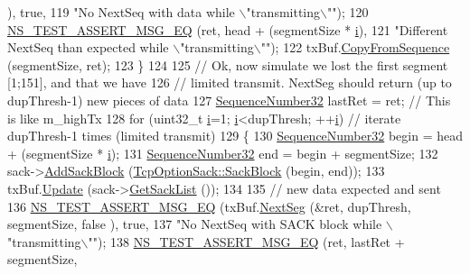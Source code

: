 \begin{DoxyCode}
      ), \textcolor{keyword}{true},
119                              \textcolor{stringliteral}{"No NextSeq with data while \(\backslash\)"transmitting\(\backslash\)""});
120       \hyperlink{group__testing_ga2a9d78cffb3db8e867c35fff0b698cf5}{NS\_TEST\_ASSERT\_MSG\_EQ} (ret, head + (segmentSize * \hyperlink{bernuolliDistribution_8m_a6f6ccfcf58b31cb6412107d9d5281426}{i}),
121                              \textcolor{stringliteral}{"Different NextSeq than expected while \(\backslash\)"transmitting\(\backslash\)""});
122       txBuf.\hyperlink{classns3_1_1TcpTxBuffer_a5eb9c889cfad2cd11a5ccf996c506fd3}{CopyFromSequence} (segmentSize, ret);
123     \}
124 
125   \textcolor{comment}{// Ok, now simulate we lost the first segment [1;151], and that we have}
126   \textcolor{comment}{// limited transmit. NextSeg should return (up to dupThresh-1) new pieces of data}
127   \hyperlink{classns3_1_1SequenceNumber}{SequenceNumber32} lastRet = ret; \textcolor{comment}{// This is like m\_highTx}
128   \textcolor{keywordflow}{for} (uint32\_t \hyperlink{bernuolliDistribution_8m_a6f6ccfcf58b31cb6412107d9d5281426}{i}=1; \hyperlink{bernuolliDistribution_8m_a6f6ccfcf58b31cb6412107d9d5281426}{i}<dupThresh; ++\hyperlink{bernuolliDistribution_8m_a6f6ccfcf58b31cb6412107d9d5281426}{i}) \textcolor{comment}{// iterate dupThresh-1 times (limited transmit)}
129     \{
130       \hyperlink{classns3_1_1SequenceNumber}{SequenceNumber32} begin = head + (segmentSize * \hyperlink{bernuolliDistribution_8m_a6f6ccfcf58b31cb6412107d9d5281426}{i});
131       \hyperlink{classns3_1_1SequenceNumber}{SequenceNumber32} end = begin + segmentSize;
132       sack->\hyperlink{classns3_1_1TcpOptionSack_ab7fe631445815bbb5f5bd2e7d6fd2662}{AddSackBlock} (\hyperlink{classns3_1_1TcpOptionSack_a9e1d07d8729fd3ac5ead7305794675c3}{TcpOptionSack::SackBlock} (begin, end));
133       txBuf.\hyperlink{classns3_1_1TcpTxBuffer_abed2d31821b2d946068c517195f5cc61}{Update} (sack->\hyperlink{classns3_1_1TcpOptionSack_a08840a554682aeb3aadbccfbb1f6b6fa}{GetSackList} ());
134 
135       \textcolor{comment}{// new data expected and sent}
136       \hyperlink{group__testing_ga2a9d78cffb3db8e867c35fff0b698cf5}{NS\_TEST\_ASSERT\_MSG\_EQ} (txBuf.\hyperlink{classns3_1_1TcpTxBuffer_ad08eadd0ba92849a4c4a6920b72acb69}{NextSeg} (&ret, dupThresh, segmentSize, \textcolor{keyword}{false}
      ), \textcolor{keyword}{true},
137                              \textcolor{stringliteral}{"No NextSeq with SACK block while \(\backslash\)"transmitting\(\backslash\)""});
138       \hyperlink{group__testing_ga2a9d78cffb3db8e867c35fff0b698cf5}{NS\_TEST\_ASSERT\_MSG\_EQ} (ret, lastRet + segmentSize,

\end{DoxyCode}
